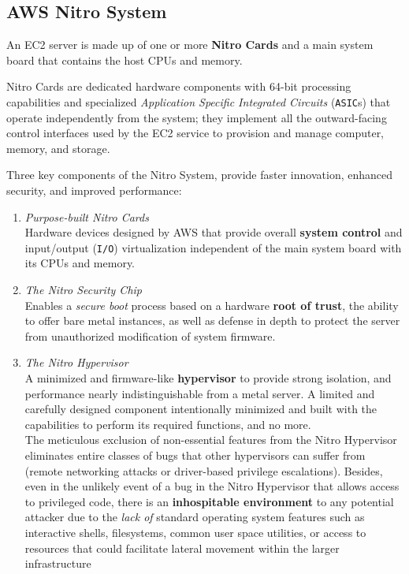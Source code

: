 \subsection{AWS Nitro System}
An EC2 server is made up of one or more \textbf{Nitro Cards} and a main system
board that contains the host CPUs and memory.

Nitro Cards are dedicated hardware components with 64-bit processing
capabilities and specialized \textit{Application Specific Integrated Circuits}
(\texttt{ASIC}s) that operate independently from the system; 
they implement all the outward-facing control interfaces used by the EC2 service to provision and manage computer, memory, and storage.

Three key components of the Nitro System, provide faster innovation, enhanced
security, and improved performance:
\begin{enumerate}
   \item \textit{Purpose-built Nitro Cards}\\
   Hardware devices designed by AWS that
   provide overall \textbf{system control} and input/output (\texttt{I/O}) virtualization
   independent of the main system board with its CPUs and memory.
   \item \textit{The Nitro Security Chip}\\
   Enables a \textit{secure boot} process based on a
   hardware \textbf{root of trust}, the ability to offer bare metal instances, as well as
   defense in depth to protect the server from unauthorized modification of
   system firmware.
   \item \textit{The Nitro Hypervisor}\\
   A minimized and firmware-like \textbf{hypervisor} to
   provide strong isolation, and performance nearly indistinguishable from a metal server.
   A limited and carefully designed component intentionally minimized and built with the capabilities to perform its required functions, and no more.\\
   The meticulous exclusion of non-essential features from the Nitro
   Hypervisor eliminates entire classes of bugs that other hypervisors
   can suffer from (remote networking attacks or driver-based privilege
   escalations).
   Besides, even in the unlikely event of a bug in the Nitro Hypervisor that allows
   access to privileged code, there is an \textbf{inhospitable environment} to any
   potential attacker due to the \textit{lack of} standard operating system
   features such as interactive shells, filesystems, common user space
   utilities, or access to resources that could facilitate lateral movement
   within the larger infrastructure

\end{enumerate}


